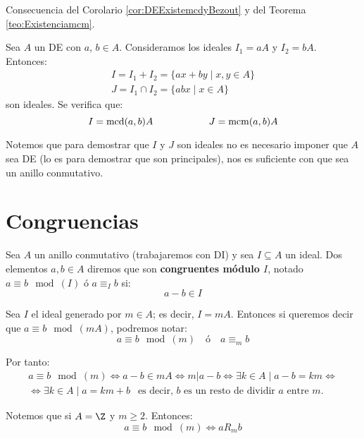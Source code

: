 \begin{coro}
    Consecuencia del Corolario \ref{cor:DEExistemcdyBezout} y del Teorema \ref{teo:Existenciamcm}.
    
    Sea $A$ un DE con $a$, $b \in A$. Consideramos los ideales $I_1 = aA$ y $I_2 = bA$. Entonces:
    \begin{gather*}
        I=I_1 + I_2 = \{ax+by \mid x,y \in A\} \\
        J=I_1 \cap I_2 = \{abx \mid x \in A\}
    \end{gather*}
    son ideales. Se verifica que:
    \begin{equation*}
        I=\operatorname{mcd}(a,b)A \hspace{2cm} J=\operatorname{mcm}(a,b)A
    \end{equation*}
    
    Notemos que para demostrar que $I$ y $J$ son ideales no es necesario imponer que $A$ sea DE (lo es para demostrar que son
    principales), nos es suficiente con que sea un anillo conmutativo.
\end{coro}

\section{Congruencias}
\begin{definicion}
    Sea $A$ un anillo conmutativo (trabajaremos con DI) y sea $I \subseteq A$ un ideal. Dos elementos $a,b \in A$ diremos que son \textbf{congruentes módulo $I$}, notado $a\equiv b\mod(I)$ ó $a\equiv_I b$ si:
    $$a-b \in I$$
\end{definicion}

\begin{notacion}
    Sea $I$ el ideal generado por $m \in A$; es decir, $I=mA$. Entonces si queremos decir que $a\equiv b\mod(mA)$, podremos notar:
    $$a\equiv b\mod(m)~~~\mbox{ ó }~~~a\equiv_m b$$
\end{notacion}


Por tanto:
\begin{multline*}
    a\equiv b\mod(m) \Longleftrightarrow a-b \in mA \Longleftrightarrow m|a-b \Longleftrightarrow \exists k \in A \mid a-b=km \Longleftrightarrow \\
    \Longleftrightarrow \exists k \in A \mid a = km + b ~~\mbox{ es decir, $b$ es un resto de dividir $a$ entre $m$.}
\end{multline*}

Notemos que si $A=\Z$ y $m\geq 2$. Entonces:
$$a\equiv b\mod(m) \Longleftrightarrow aR_mb $$


